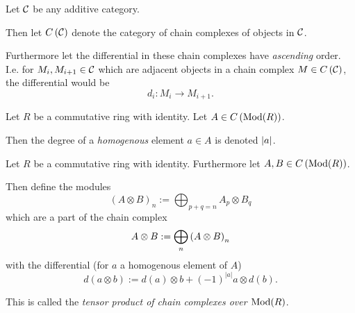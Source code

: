 \begin{notation}
    Let \( {\mathcal{C}} \) be any additive category.
    
    Then let \( C \left( {\mathcal{C}} \right) \) denote the category of chain complexes of objects in \( {\mathcal{C}} \).

    Furthermore let the differential in these chain complexes have \emph{ascending} order. I.e. for \( M_i, M_{i+1} \in {\mathcal{C}} \) which are adjacent objects in a chain complex \( M \in C \left( {\mathcal{C}} \right) \), the differential would be
    \[
        d_i : M_i \to M_{i + 1}.
    \]
\end{notation}

\begin{notation}
    Let \( R \) be a commutative ring with identity. Let \( A \in C \left( \operatorname{Mod}(R) \right) \).

    Then the degree of a \emph{homogenous} element \( a \in A \) is denoted \emph{\( \lvert a \rvert \)}.
\end{notation}

\begin{definition}
    \label{def:massey_product_in_dg_cat/what_is_a_dg_cat/tensor_product_of_chain_complexes}
    Let \( R \) be a commutative ring with identity. Furthermore let \( A, B \in C \left( \operatorname{Mod}(R) \right) \).

    Then define the modules
    \[
        (A \otimes B)_n := \bigoplus_{p + q = n} A_p \otimes B_q
    \]
    which are a part of the chain complex
    \[
        A \otimes B := \bigoplus_n \left( A \otimes B \right)_n
    \]
    with the differential (for \( a \) a homogenous element of \( A \))
    \[
        d(a \otimes b) := d(a) \otimes b + (-1)^{|a|} a \otimes d(b).
    \]

    This is called the \emph{tensor product of chain complexes over \( \operatorname{Mod}(R) \)}.
\end{definition}



